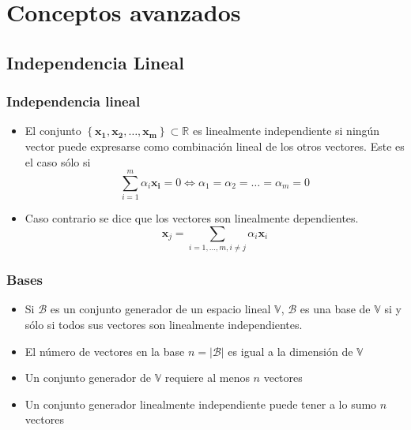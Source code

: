\documentclass{beamer}
\begin{document}
%
\section{Conceptos avanzados}
\subsection{Independencia Lineal}
\begin{frame}
\frametitle{Independencia lineal}
\begin{itemize}
\item El conjunto $ \left\lbrace  \boldsymbol{x_1,x_2, \ldots, x_m } \right\rbrace \subset \mathbb{R}$ es linealmente independiente si ningún vector puede expresarse como combinación lineal de los otros vectores. Este es el caso sólo si 
\begin{equation*}
\sum_{i=1}^{m}\alpha_{i}\boldsymbol{x_{i}}= 0 \Leftrightarrow \alpha_{1}=\alpha_2=\ldots= \alpha_{m}=0
\end{equation*}   
\item Caso contrario se dice que los vectores son linealmente dependientes. 
\begin{equation*}
\boldsymbol{x}_j=  \sum_{i=1,\ldots, m, i\neq j} \alpha_{i}\boldsymbol{x}_{i}
\end{equation*}
\end{itemize}
\end{frame}

\begin{frame}
\frametitle{Bases}
\begin{itemize}
\item Si $\mathcal{B}$ es un conjunto generador de un espacio lineal $\mathbb{V}$, $\mathcal{B}$ es una base de $\mathbb{V}$ si y sólo si todos sus vectores son linealmente independientes.
\item El número de vectores en la base $n= \vert \mathcal{B}\vert$ es igual a la dimensión de $\mathbb{V}$ 
\item Un conjunto generador de $\mathbb{V}$ requiere al menos $n$ vectores
\item Un conjunto generador linealmente independiente puede tener a lo sumo $n$ vectores 
\end{itemize}
\end{frame}
\end{document}
